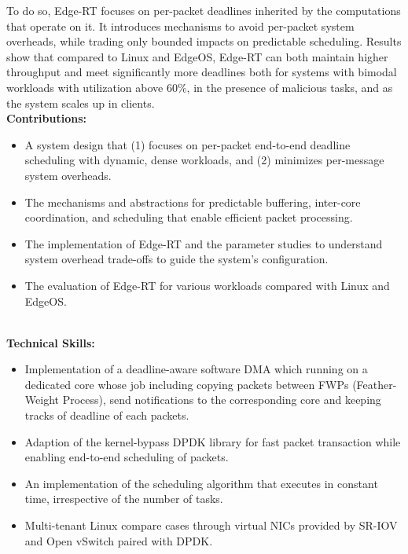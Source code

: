 To do so, Edge-RT focuses on per-packet deadlines inherited by the computations that operate on it.
It introduces mechanisms to avoid per-packet system overheads, while trading only bounded impacts on predictable scheduling.
Results show that compared to Linux and EdgeOS, Edge-RT can both maintain higher throughput and meet significantly more deadlines both for systems with bimodal workloads with utilization above 60\%, in the presence of malicious tasks, and as the system scales up in clients.
\\
\textbf{\small Contributions:}
\begin{itemize}[leftmargin=*]
  \setlength\itemsep{-0.0em}
        \item A system design that (1) focuses on per-packet end-to-end deadline scheduling with dynamic, dense workloads, and (2) minimizes per-message system overheads.
        \item The mechanisms and abstractions for predictable buffering, inter-core coordination, and scheduling that enable efficient packet processing.
        \item The implementation of Edge-RT and the parameter studies to understand system overhead trade-offs to guide the
system’s configuration.
        \item The evaluation of Edge-RT for various workloads compared with Linux and EdgeOS.
\end{itemize}
\vspace{-1.0em}
\
\\
\textbf{\small Technical Skills:}
\begin{itemize}[leftmargin=*]
   \setlength\itemsep{-0.0em}
   	\item Implementation of a deadline-aware software DMA which running on a dedicated core whose job including copying packets between FWPs (Feather-Weight Process), send notifications to the corresponding core and keeping tracks of deadline of each packets.
   	\item Adaption of the kernel-bypass DPDK library for fast packet transaction while enabling end-to-end scheduling of packets.
	\item An implementation of the scheduling algorithm that executes in constant time, irrespective of the number of tasks.
	\item Multi-tenant Linux compare cases through virtual NICs provided by SR-IOV and Open vSwitch paired with DPDK.
\end{itemize}
